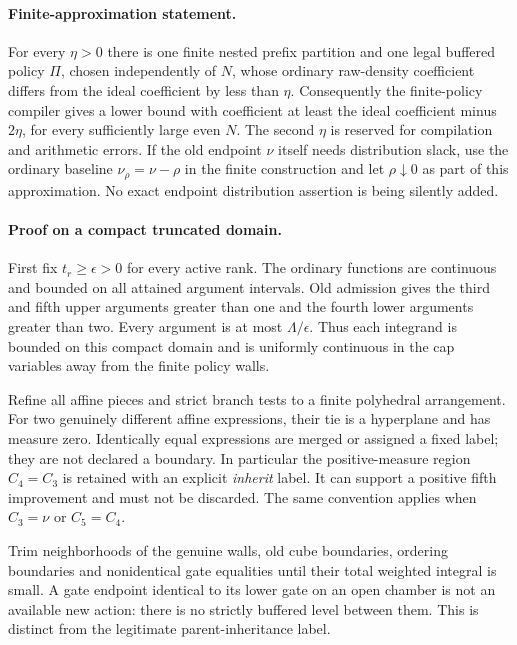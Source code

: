 \paragraph{Finite-approximation statement.}
For every $\eta>0$ there is one finite nested prefix partition and
one legal buffered policy $\Pi$, chosen independently of $N$, whose
ordinary raw-density coefficient differs from the ideal coefficient
by less than $\eta$. Consequently the finite-policy compiler gives
a lower bound with coefficient at least the ideal coefficient minus
$2\eta$, for every sufficiently large even $N$.
The second $\eta$ is reserved for compilation and arithmetic errors.
If the old endpoint $\nu$ itself needs distribution slack, use the
ordinary baseline $\nu_\rho=\nu-\rho$ in the finite construction and
let $\rho\downarrow0$ as part of this approximation. No exact endpoint
distribution assertion is being silently added.

\paragraph{Proof on a compact truncated domain.}
First fix $t_r\ge\epsilon>0$ for every active rank. The ordinary
functions are continuous and bounded on all attained argument
intervals. Old admission gives the third and fifth upper arguments
greater than one and the fourth lower arguments greater than two.
Every argument is at most $\Lambda/\epsilon$. Thus each integrand
is bounded on this compact domain and is uniformly continuous
in the cap variables away from the finite policy walls.

Refine all affine pieces and strict branch tests to a finite
polyhedral arrangement. For two genuinely different affine expressions,
their tie is a hyperplane and has measure zero. Identically equal
expressions are merged or assigned a fixed label; they are not
declared a boundary. In particular the positive-measure region
$C_4=C_3$ is retained with an explicit \emph{inherit} label.
It can support a positive fifth improvement and must not be discarded.
The same convention applies when $C_3=\nu$ or $C_5=C_4$.

Trim neighborhoods of the genuine walls, old cube boundaries,
ordering boundaries and nonidentical gate equalities until their
total weighted integral is small. A gate endpoint identical to its
lower gate on an open chamber is not an available new action:
there is no strictly buffered level between them. This is distinct
from the legitimate parent-inheritance label.

